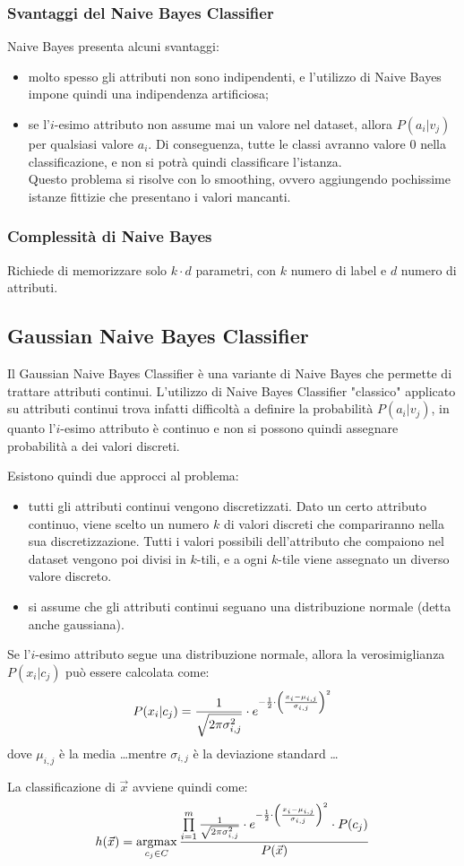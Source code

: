 \subsubsection{Svantaggi del Naive Bayes Classifier}
Naive Bayes presenta alcuni svantaggi:
\begin{itemize}
    \item molto spesso gli attributi non sono indipendenti, e l'utilizzo di Naive Bayes impone quindi una indipendenza artificiosa;
    \item se l'$i$-esimo attributo non assume mai un valore nel dataset, allora $P(a_i | v_j)$ per qualsiasi valore $a_i$. Di conseguenza, tutte le classi avranno valore $0$ nella classificazione, e non si potrà quindi classificare l'istanza.\\
    Questo problema si risolve con lo smoothing, ovvero aggiungendo pochissime istanze fittizie che presentano i valori mancanti.
\end{itemize}

\subsubsection{Complessità di Naive Bayes}
Richiede di memorizzare solo $k \cdot d$ parametri, con $k$ numero di label e $d$ numero di attributi.

\subsection{Gaussian Naive Bayes Classifier}
Il Gaussian Naive Bayes Classifier è una variante di Naive Bayes che permette di trattare attributi continui.
L'utilizzo di Naive Bayes Classifier "classico" applicato su attributi continui trova infatti difficoltà a definire la probabilità $P(a_i | v_j)$, in quanto l'$i$-esimo attributo è continuo e non si possono quindi assegnare probabilità a dei valori discreti.

Esistono quindi due approcci al problema:
\begin{itemize}
    \item tutti gli attributi continui vengono discretizzati. Dato un certo attributo continuo, viene scelto un numero $k$ di valori discreti che compariranno nella sua discretizzazione. Tutti i valori possibili dell'attributo che compaiono nel dataset vengono poi divisi in $k$-tili, e a ogni $k$-tile viene assegnato un diverso valore discreto.
    \item si assume che gli attributi continui seguano una distribuzione normale (detta anche gaussiana).
\end{itemize}

Se l'$i$-esimo attributo segue una distribuzione normale, allora la verosimiglianza $P(x_i | c_j)$ può essere calcolata come:
\[
    P(x_i | c_j) = \frac{1}{\sqrt{2 \pi \sigma_{i,j}^2}} \cdot e^{-\frac{1}{2} \cdot \left(\frac{x_i - \mu_{i,j}}{\sigma_{i,j}}\right)^2}
\]
dove $\mu_{i,j}$ è la media \ldots mentre $\sigma_{i,j}$ è la deviazione standard \ldots

La classificazione di $\Vec{x}$ avviene quindi come:
\[
    h(\Vec{x}) = \operatorname*{argmax}\limits_{c_j \in C} \frac{\prod\limits_{i=1}^m \frac{1}{\sqrt{2 \pi \sigma_{i,j}^2}} \cdot e^{-\frac{1}{2} \cdot \left(\frac{x_i - \mu_{i,j}}{\sigma_{i,j}}\right)^2} \cdot P(c_j)}{P(\Vec{x})}
\]